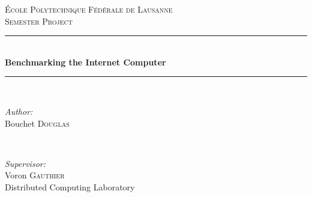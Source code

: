 \documentclass{article}
\begin{document}
\begin{titlepage}

    \newcommand{\HRule}{\rule{\linewidth}{0.5mm}} %

    \center %


    \textsc{\LARGE École Polytechnique Fédérale de Lausanne}\\[1.5cm] %
    \textsc{\Large Semester Project}\\[0.5cm] %


    \HRule \\[0.4cm]
    { \huge \bfseries Benchmarking the Internet Computer}\\[0.4cm] %
    \HRule \\[1.5cm]


    \begin{minipage}{0.4\textwidth}
    \begin{flushleft} \large
    \emph{Author:}\\
    Bouchet \textsc{Douglas}\\
    \end{flushleft}
    \end{minipage}
    ~
    \begin{minipage}{0.4\textwidth}
    \begin{flushright} \large
    \emph{Supervisor:} \\
    Voron \textsc{Gauthier} \\
    Distributed Computing Laboratory
    \end{flushright}
    \end{minipage}\\[2cm]



\end{titlepage}
\end{document}

